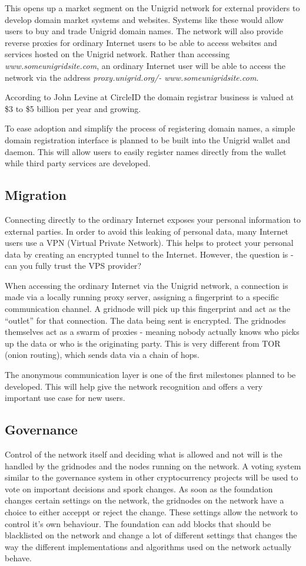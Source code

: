 \documentclass{article}
\begin{document}
This opens up a market segment on the Unigrid network for external providers to develop domain market systems and websites. Systems like these would allow users to buy and trade Unigrid domain names. The network will also provide reverse proxies for ordinary Internet users to be able to access websites and services hosted on the Unigrid network. Rather than accessing \emph{www.someunigridsite.com}, an ordinary Internet user will be able to access the network via the address \emph{proxy.unigrid.org/- www.someunigridsite.com}.

According to John Levine at CircleID \cite{john2018} the domain registrar business is valued at \$3 to \$5 billion per year and growing.

To ease adoption and simplify the process of registering domain names, a simple domain registration interface is planned to be built into the Unigrid wallet and daemon. This will allow users to easily register names directly from the wallet while third party services are developed.

\subsection{Migration}
Connecting directly to the ordinary Internet exposes your personal information to external parties. In order to avoid this leaking of personal data, many Internet users use a VPN (Virtual Private Network). This helps to protect your personal data by creating an encrypted tunnel to the Internet. However, the question is - can you fully trust the VPS provider?

When accessing the ordinary Internet via the Unigrid network, a connection is made via a locally running proxy server, assigning a fingerprint to a specific communication channel. A gridnode will pick up this fingerprint and act as the “outlet” for that connection. The data being sent is encrypted. The gridnodes themselves act as a swarm of proxies - meaning nobody actually knows who picks up the data or who is the originating party. This is very different from TOR (onion routing), which sends data via a chain of hops.

The anonymous communication layer is one of the first milestones planned to be developed. This will help give the network recognition and offers a very important use case for new users.

\subsection{Governance}
Control of the network itself and deciding what is allowed and not will is the handled by the gridnodes and the nodes running on the network. A voting system similar to the governance system in other cryptocurrency projects will be used to vote on important decisions and spork changes. As soon as the foundation changes certain settings on the network, the gridnodes on the network have a choice to either acceppt or reject the change. These settings allow the network to control it's own behaviour. The foundation can add blocks that should be blacklisted on the network and change a lot of different settings that changes the way the different implementations and algorithms used on the network actually behave.
\end{document}
